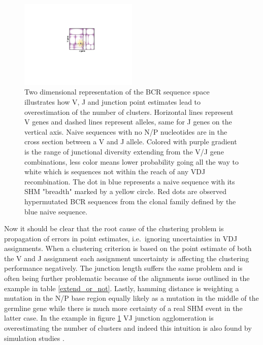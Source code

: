 \begin{figure}[ht]
    \centering
    \includegraphics[width=0.5\textwidth]{figures/VJ_CDR3_agglomeration.pdf}
    \caption{
        \label{fig:VJ_CDR3_agglomeration}
        Two dimensional representation of the BCR sequence space illustrates how V, J and junction point estimates lead to overestimation of the number of clusters.
        Horizontal lines represent V genes and dashed lines represent alleles, same for J genes on the vertical axis.
        Naive sequences with no N/P nucleotides are in the cross section between a V and J allele.
        Colored with purple gradient is the range of junctional diversity extending from the V/J gene combinations, less color means lower probability going all the way to white which is sequences not within the reach of any VDJ recombination.
        The dot in blue represents a naive sequence with its SHM "breadth" marked by a yellow circle.
        Red dots are observed hypermutated BCR sequences from the clonal family defined by the blue naive sequence.
    }
\end{figure}


Now it should be clear that the root cause of the clustering problem is propagation of errors in point estimates, i.e.\ ignoring uncertainties in VDJ assignments.
When a clustering criterion is based on the point estimate of both the V and J assignment each assignment uncertainty is affecting the clustering performance negatively.
The junction length suffers the same problem and is often being further problematic because of the alignments issue outlined in the example in table \ref{extend_or_not}.
Lastly, hamming distance is weighting a mutation in the N/P base region equally likely as a mutation in the middle of the germline gene while there is much more certainty of a real SHM event in the latter case.
In the example in figure \ref{fig:VJ_CDR3_agglomeration} VJ junction agglomeration is overestimating the number of clusters and indeed this intuition is also found by simulation studies \cite{ralph2016likelihood}.

